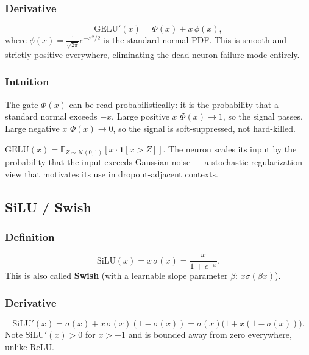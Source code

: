 \documentclass[12pt,a4paper]{article}
\theoremstyle{definition}
\theoremstyle{remark}
\newcommand{\E}{\mathbb{E}}
\begin{document}
\subsubsection{Derivative}

\[
\mathrm{GELU}'(x) = \Phi(x) + x\,\phi(x),
\]
where $\phi(x) = \frac{1}{\sqrt{2\pi}}e^{-x^2/2}$ is the standard normal PDF. This is smooth and strictly positive everywhere, eliminating the dead-neuron failure mode entirely.

\subsubsection{Intuition}

The gate $\Phi(x)$ can be read probabilistically: it is the probability that a standard normal exceeds $-x$. Large positive $x$ \textrightarrow{} $\Phi(x) \to 1$, so the signal passes. Large negative $x$ \textrightarrow{} $\Phi(x) \to 0$, so the signal is soft-suppressed, not hard-killed.

\begin{keybox}
$\mathrm{GELU}(x) = \E_{Z \sim \mathcal{N}(0,1)}[x \cdot \mathbf{1}[x > Z]].$
The neuron scales its input by the probability that the input exceeds Gaussian noise — a stochastic regularization view that motivates its use in dropout-adjacent contexts.
\end{keybox}

\subsection{SiLU / Swish}

\subsubsection{Definition}

\[
\mathrm{SiLU}(x) = x\,\sigma(x) = \frac{x}{1+e^{-x}}.
\]
This is also called \textbf{Swish} (with a learnable slope parameter $\beta$: $x\sigma(\beta x)$).

\subsubsection{Derivative}

\[
\mathrm{SiLU}'(x) = \sigma(x) + x\,\sigma(x)(1-\sigma(x)) = \sigma(x)\bigl(1 + x(1-\sigma(x))\bigr).
\]
Note $\mathrm{SiLU}'(x) > 0$ for $x > -1$ and is bounded away from zero everywhere, unlike ReLU.
\end{document}
